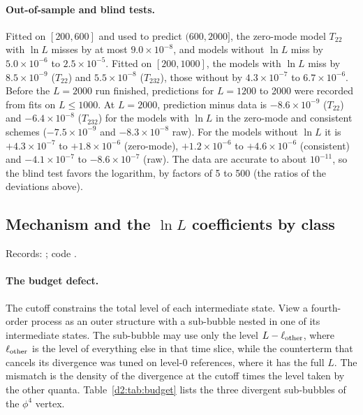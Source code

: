\paragraph{Out-of-sample and blind tests.} Fitted on $[200,600]$ and used to predict $(600,2000]$, the zero-mode model
$T_{22}$ with $\ln L$ misses by at most $9.0\times10^{-8}$, and models without $\ln L$ miss by $5.0\times10^{-6}$ to
$2.5\times10^{-5}$. Fitted on $[200,1000]$, the models with $\ln L$ miss by $8.5\times10^{-9}$ ($T_{22}$) and
$5.5\times10^{-8}$ ($T_{232}$), those without by $4.3\times10^{-7}$ to $6.7\times10^{-6}$. Before the $L=2000$ run finished,
predictions for $L=1200$ to 2000 were recorded from fits on $L\le1000$. At $L=2000$, prediction minus data is
$-8.6\times10^{-9}$ ($T_{22}$) and $-6.4\times10^{-8}$ ($T_{232}$) for the models with $\ln L$ in the zero-mode and
consistent schemes ($-7.5\times10^{-9}$ and $-8.3\times10^{-8}$ raw). For the models without $\ln L$ it is $+4.3\times10^{-7}$
to $+1.8\times10^{-6}$ (zero-mode), $+1.2\times10^{-6}$ to $+4.6\times10^{-6}$ (consistent) and $-4.1\times10^{-7}$ to
$-8.6\times10^{-7}$ (raw). The data are accurate to about $10^{-11}$, so the blind test favors the logarithm, by factors of 5 to
500 (the ratios of the deviations above).

\subsection{Mechanism and the \texorpdfstring{$\ln L$}{ln L} coefficients by class}\label{d2:app:mech}
{\small\raggedright\noindent Records: ; code .\par}

\paragraph{The budget defect.} The cutoff constrains the total level of each intermediate state. View a fourth-order
process as an outer structure with a sub-bubble nested in one of its intermediate states. The sub-bubble may use only the
level $L-\ell_{\rm other}$, where $\ell_{\rm other}$ is the level of everything else in that time slice, while the
counterterm that cancels its divergence was tuned on level-0 references, where it has the full $L$. The mismatch is the
density of the divergence at the cutoff times the level taken by the other quanta. Table~\ref{d2:tab:budget} lists the
three divergent sub-bubbles of the $\phi^4$ vertex.

